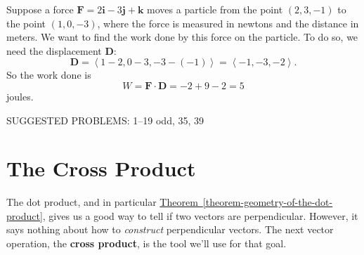 \documentclass[10pt,]{book}
\newcommand{\terminology}[1]{\textbf{#1}}
\theoremstyle{ptxplainnotitle}
\theoremstyle{ptxplaintitle}
\theoremstyle{ptxplainnotitle}
\theoremstyle{ptxplaintitle}
\theoremstyle{ptxplainnotitle}
\theoremstyle{ptxplaintitle}
\theoremstyle{ptxdefinitionnotitle}
\theoremstyle{ptxdefinitiontitle}
\theoremstyle{ptxdefinitionnotitle}
\theoremstyle{ptxdefinitiontitle}
\theoremstyle{ptxdefinitionnotitle}
\theoremstyle{ptxdefinitiontitle}
\theoremstyle{ptxdefinitionnotitle}
\theoremstyle{ptxdefinitiontitle}
\theoremstyle{ptxdefinitionnotitle}
\theoremstyle{ptxdefinitiontitle}
\numberwithin{equation}{section}
\newcommand{\vv}[1]{\mathbf{#1}}
\newcommand{\dotprod}[1]{\left\langle #1 \right\rangle}
\begin{document}
\begin{example}\label{example-finding-work-done-by-a-force}
\hypertarget{p-818}{}%
Suppose a force \(\vv{F} = 2\vv{i}-3\vv{j}+\vv{k}\) moves a particle from the point \((2,3,-1)\) to the point \((1,0,-3)\), where the force is measured in newtons and the distance in meters. We want to find the work done by this force on the particle. To do so, we need the displacement \(\vv{D}\):%
%
\begin{equation*}
\vv{D} = \dotprod{1-2,0-3,-3-(-1)} = \dotprod{-1,-3,-2}.
\end{equation*}
\hypertarget{p-819}{}%
So the work done is%
%
\begin{equation*}
W = \vv{F}\cdot\vv{D} = -2+9-2 = 5
\end{equation*}
\hypertarget{p-820}{}%
joules.%
\end{example}
\hypertarget{p-821}{}%
SUGGESTED PROBLEMS: 1--19 odd, 35, 39%
\typeout{************************************************}
\typeout{************************************************}
\section[{The Cross Product}]{The Cross Product}\label{section-the-cross-product}
\hypertarget{p-822}{}%
The dot product, and in particular \hyperref[theorem-geometry-of-the-dot-product]{Theorem~\ref{theorem-geometry-of-the-dot-product}}, gives us a good way to tell if two vectors are perpendicular. However, it says nothing about how to \emph{construct} perpendicular vectors. The next vector operation, the \terminology{cross product}, is the tool we'll use for that goal.%
\typeout{************************************************}
\typeout{************************************************}
\end{document}
